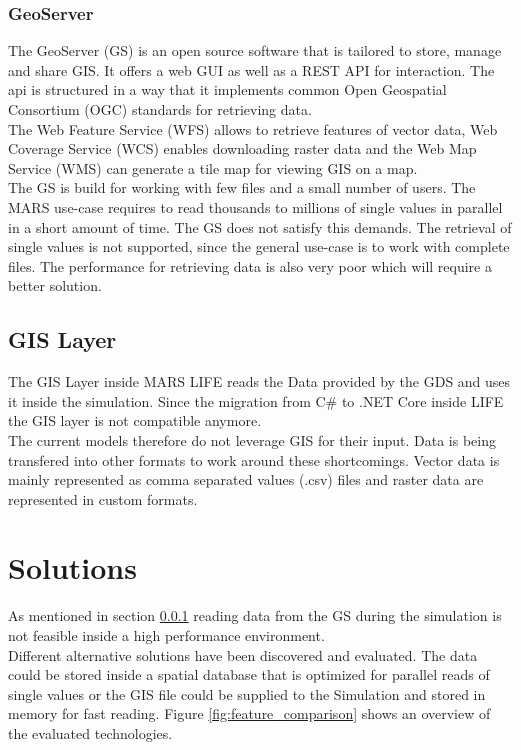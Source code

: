 \subsubsection{GeoServer} \label{sec:GS}
The GeoServer (GS) is an open source software that is tailored to store, manage and share GIS. It offers a web GUI as well as a REST API for interaction. The api is structured in a way that it implements common Open Geospatial Consortium (OGC) standards for retrieving data.\\
The Web Feature Service (WFS) allows to retrieve features of vector data, Web Coverage Service (WCS) enables downloading raster data and the Web Map Service (WMS) can generate a tile map for viewing GIS on a map.\\
The GS is build for working with few files and a small number of users. The MARS use-case requires to read thousands to millions of  single values in parallel in a short amount of time. The GS does not satisfy this demands. The retrieval of single values is not supported, since the general use-case is to work with complete files. The performance for retrieving data is also very poor which will require a better solution.


\subsection{GIS Layer}
The GIS Layer inside MARS LIFE reads the Data provided by the GDS and uses it inside the simulation. Since the migration from C\# to .NET Core inside LIFE the GIS layer is not compatible anymore.\\
The current models therefore do not leverage GIS for their input. Data is being transfered into other formats to work around these shortcomings. Vector data is mainly represented as comma separated values (.csv) files and raster data are represented in custom formats.


\section{Solutions}
As mentioned in section \ref{sec:GS} reading data from the GS during the simulation is not feasible inside a high performance environment.\\
Different alternative solutions have been discovered and evaluated. The data could be stored inside a spatial database that is optimized for parallel reads of single values or the GIS file could be supplied to the Simulation and stored in memory for fast reading. Figure \ref{fig:feature_comparison} shows an overview of the evaluated technologies.

